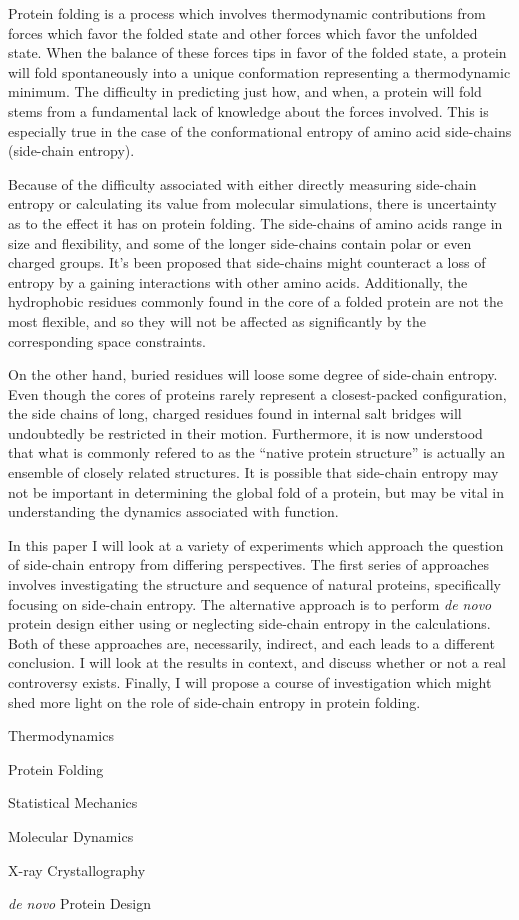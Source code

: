 Protein folding is a process which involves thermodynamic contributions from forces which favor the folded state and other forces which favor the unfolded state. When the balance of these forces tips in favor of the folded state, a protein will fold spontaneously into a unique conformation representing a thermodynamic minimum. The difficulty in predicting just how, and when, a protein will fold stems from a fundamental lack of knowledge about the forces involved. This is especially true in the case of the conformational entropy of amino acid side-chains (side-chain entropy).

Because of the difficulty associated with either directly measuring side-chain entropy or calculating its value from molecular simulations, there is uncertainty as to the effect it has on protein folding. The side-chains of amino acids range in size and flexibility, and some of the longer side-chains contain polar or even charged groups. It’s been proposed that side-chains might counteract a loss of entropy by a gaining interactions with other amino acids. Additionally, the hydrophobic residues commonly found in the core of a folded protein are not the most flexible, and so they will not be affected as significantly by the corresponding space constraints.

On the other hand, buried residues will loose some degree of side-chain entropy. Even though the cores of proteins rarely represent a closest-packed configuration, the side chains of long, charged residues found in internal salt bridges will undoubtedly be restricted in their motion. Furthermore, it is now understood that what is commonly refered to as the ``native protein structure'' is actually an ensemble of closely related structures. It is possible that side-chain entropy may not be important in determining the global fold of a protein, but may be vital in understanding the dynamics associated with function.

In this paper I will look at a variety of experiments which approach the question of side-chain entropy from differing perspectives. The first series of approaches involves investigating the structure and sequence of natural proteins, specifically focusing on side-chain entropy. The alternative approach is to perform \emph{de novo} protein design either using or neglecting side-chain entropy in the calculations. Both of these approaches are, necessarily, indirect, and each leads to a different conclusion. I will look at the results in context, and discuss whether or not a real controversy exists. Finally, I will propose a course of investigation which might shed more light on the role of side-chain entropy in protein folding.

\begin{description}
	\item[Topics] 
	\item Thermodynamics 
	\item Protein Folding
	\item Statistical Mechanics
	\item Molecular Dynamics
	\item X-ray Crystallography
	\item \emph{de novo} Protein Design
\end{description}